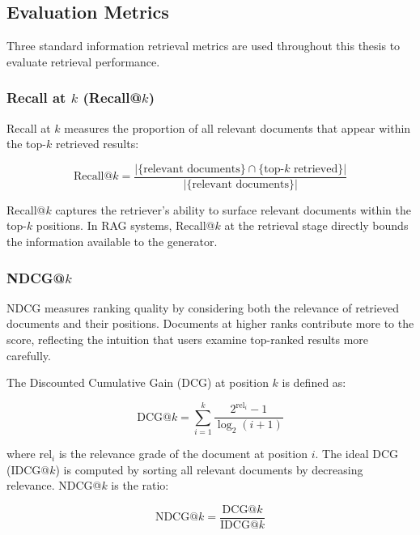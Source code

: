 \subsection{Evaluation Metrics}
\label{sec:eval_metrics}

Three standard information retrieval metrics are used throughout this thesis to evaluate retrieval performance.

\subsubsection{Recall at $k$ (Recall@$k$)}
\label{sec:recall_math}

Recall at $k$ measures the proportion of all relevant documents that appear within the top-$k$ retrieved results:

\begin{equation}
\text{Recall@}k = \frac{|\{\text{relevant documents}\} \cap \{\text{top-}k \text{ retrieved}\}|}{|\{\text{relevant documents}\}|}
\label{eq:recall}
\end{equation}

\noindent Recall@$k$ captures the retriever's ability to surface relevant documents within the top-$k$ positions. In RAG systems, Recall@$k$ at the retrieval stage directly bounds the information available to the generator.

\subsubsection{NDCG@$k$}
\label{sec:ndcg_math}

NDCG measures ranking quality by considering both the relevance of retrieved documents and their positions. Documents at higher ranks contribute more to the score, reflecting the intuition that users examine top-ranked results more carefully.

The Discounted Cumulative Gain (DCG) at position $k$ is defined as:

\begin{equation}
\text{DCG@}k = \sum_{i=1}^{k} \frac{2^{\text{rel}_i} - 1}{\log_2(i + 1)}
\label{eq:dcg}
\end{equation}

\noindent where $\text{rel}_i$ is the relevance grade of the document at position $i$. The ideal DCG (IDCG@$k$) is computed by sorting all relevant documents by decreasing relevance. NDCG@$k$ is the ratio:

\begin{equation}
\text{NDCG@}k = \frac{\text{DCG@}k}{\text{IDCG@}k}
\label{eq:ndcg}
\end{equation}

